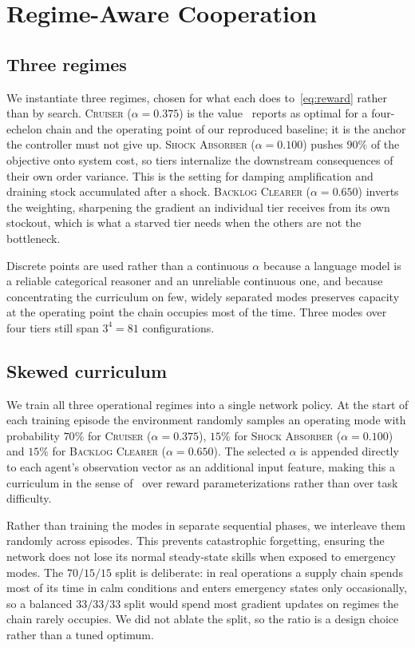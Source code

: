 \documentclass[conference]{IEEEtran}
\begin{document}
\section{Regime-Aware Cooperation}

\subsection{Three regimes}
We instantiate three regimes, chosen for what each does
to~\eqref{eq:reward} rather than by search.
\textsc{Cruiser} ($\alpha = 0.375$) is the value~\cite{liu2022} reports as
optimal for a four-echelon chain and the operating point of our reproduced
baseline; it is the anchor the controller must not give up.
\textsc{Shock Absorber} ($\alpha = 0.100$) pushes $90\%$ of the objective
onto system cost, so tiers internalize the downstream consequences of
their own order variance. This is the setting for damping amplification and
draining stock accumulated after a shock.
\textsc{Backlog Clearer} ($\alpha = 0.650$) inverts the weighting,
sharpening the gradient an individual tier receives from its own stockout,
which is what a starved tier needs when the others are not the bottleneck.

Discrete points are used rather than a continuous $\alpha$ because a
language model is a reliable categorical reasoner and an unreliable
continuous one, and because concentrating the curriculum on few, widely
separated modes preserves capacity at the operating point the chain occupies
most of the time. Three modes over four tiers still span $3^4 = 81$
configurations.

\subsection{Skewed curriculum}
We train all three operational regimes into a single network policy. At the
start of each training episode the environment randomly samples an operating
mode with probability $70\%$ for \textsc{Cruiser} ($\alpha=0.375$), $15\%$
for \textsc{Shock Absorber} ($\alpha=0.100$) and $15\%$ for \textsc{Backlog
Clearer} ($\alpha=0.650$). The selected $\alpha$ is appended directly to each
agent's observation vector as an additional input feature, making this a
curriculum in the sense of~\cite{bengio2009} over reward parameterizations
rather than over task difficulty.

Rather than training the modes in separate sequential phases, we interleave
them randomly across episodes. This prevents catastrophic forgetting,
ensuring the network does not lose its normal steady-state skills when
exposed to emergency modes. The $70/15/15$ split is deliberate: in real
operations a supply chain spends most of its time in calm conditions and
enters emergency states only occasionally, so a balanced $33/33/33$ split
would spend most gradient updates on regimes the chain rarely occupies. We
did not ablate the split, so the ratio is a design choice rather than a
tuned optimum.
\end{document}
